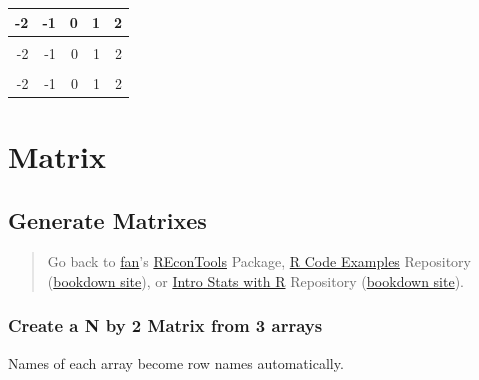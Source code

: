 \documentclass[
]{book}
\begin{document}
\begin{table}[!h]
\centering
\begin{tabular}{r|r|r|r|r}
\hline
-2 & -1 & 0 & 1 & \vphantom{4}2\\
\hline
\cellcolor{gray!6}{-2} & \cellcolor{gray!6}{-1} & \cellcolor{gray!6}{0} & \cellcolor{gray!6}{1} & \cellcolor{gray!6}{\vphantom{3}2}\\
\hline
-2 & -1 & 0 & 1 & \vphantom{2}2\\
\hline
\cellcolor{gray!6}{-2} & \cellcolor{gray!6}{-1} & \cellcolor{gray!6}{0} & \cellcolor{gray!6}{1} & \cellcolor{gray!6}{\vphantom{1}2}\\
\hline
-2 & -1 & 0 & 1 & 2\\
\hline
\end{tabular}
\end{table}

\hypertarget{matrix}{%
\section{Matrix}\label{matrix}}

\hypertarget{generate-matrixes}{%
\subsection{Generate Matrixes}\label{generate-matrixes}}

\begin{quote}
Go back to \href{http://fanwangecon.github.io/}{fan}'s \href{https://fanwangecon.github.io/REconTools/}{REconTools} Package, \href{https://fanwangecon.github.io/R4Econ/}{R Code Examples} Repository (\href{https://fanwangecon.github.io/R4Econ/bookdown}{bookdown site}), or \href{https://fanwangecon.github.io/Stat4Econ/}{Intro Stats with R} Repository (\href{https://fanwangecon.github.io/Stat4Econ/bookdown}{bookdown site}).
\end{quote}

\hypertarget{create-a-n-by-2-matrix-from-3-arrays}{%
\subsubsection{Create a N by 2 Matrix from 3 arrays}\label{create-a-n-by-2-matrix-from-3-arrays}}

Names of each array become row names automatically.
\end{document}
